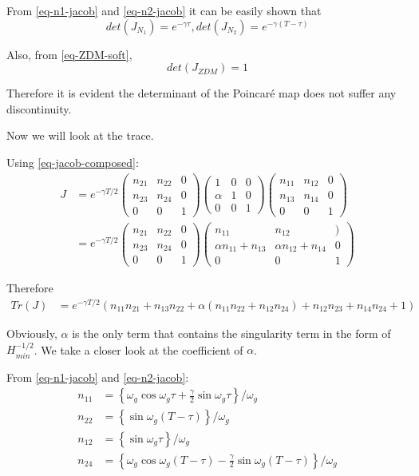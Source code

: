 \documentclass[oneside]{book}
\renewcommand{\(}{\begin{columns}}
\renewcommand{\)}{\end{columns}}
\newcommand{\<}[1]{\begin{column}{#1}}
\renewcommand{\>}{\end{column}}
\begin{document}
From \eqref{eq-n1-jacob} and  \eqref{eq-n2-jacob}  it can be easily shown that 
\[
det(J_{N_1})=e^{-\gamma\tau}, det(J_{N_2})=e^{-\gamma(T-\tau)}
\]

Also, from \eqref{eq-ZDM-soft}, \[
det(J_{ZDM})=1
\]

Therefore it is evident the determinant of the Poincaré map does not suffer 
any discontinuity.  

Now we will look at the trace.  

Using \eqref{eq-jacob-composed}:
\begin{align}
\label{eq-ZDM-total}
J&=e^{-\gamma T/2}
\begin{pmatrix}
n_{21} & n_{22} & 0\\
n_{23} & n_{24} & 0\\
0 & 0 & 1
\end{pmatrix}
\begin{pmatrix}
1 & 0 & 0\\
\alpha & 1 & 0\\
0 & 0 & 1
\end{pmatrix}
\begin{pmatrix}
n_{11} & n_{12} & 0\\
n_{13} & n_{14} & 0\\
0 & 0 & 1
\end{pmatrix}\\
&=e^{-\gamma T/2}
\begin{pmatrix}
n_{21} & n_{22} & 0\\
n_{23} & n_{24} & 0\\
0 & 0 & 1
\end{pmatrix}
\begin{pmatrix}
n_{11} & n_{12} & )\\
\alpha n_{11}+n_{13} & \alpha n_{12}+n_{14} & 0\\
0 & 0 & 1
\end{pmatrix}
\end{align}

Therefore
\begin{align}
\label{eq-trace-ZDM}
Tr(J)&=e^{-\gamma T/2}(n_{11}n_{21}+n_{13}n_{22}+\alpha(n_{11}n_{22}+n_{12}n_{24})+n_{12}n_{23}+n_{14}n_{24}+1)
\end{align}

Obviously, $\alpha$ is the only term that contains the singularity term in the 
form of $H_{min}^{-1/2}$.  We take a closer look at the coefficient of $\alpha$.  

From \eqref{eq-n1-jacob} and \eqref{eq-n2-jacob}:
\begin{align}
n_{11}&=\left\{\omega_g\cos{\omega_g \tau}+\frac{\gamma}{2}\sin{\omega_g \tau} \right\}/\omega_g\\
n_{22}&=\left\{\sin{\omega_g (T-\tau)} \right\}/\omega_g\\
n_{12}&=\left\{\sin{\omega_g \tau} \right\}/\omega_g\\
n_{24}&=\left\{\omega_g\cos{\omega_g (T-\tau)}-\frac{\gamma}{2}\sin{\omega_g (T-\tau)} \right\}/\omega_g
\end{align}
\end{document}
